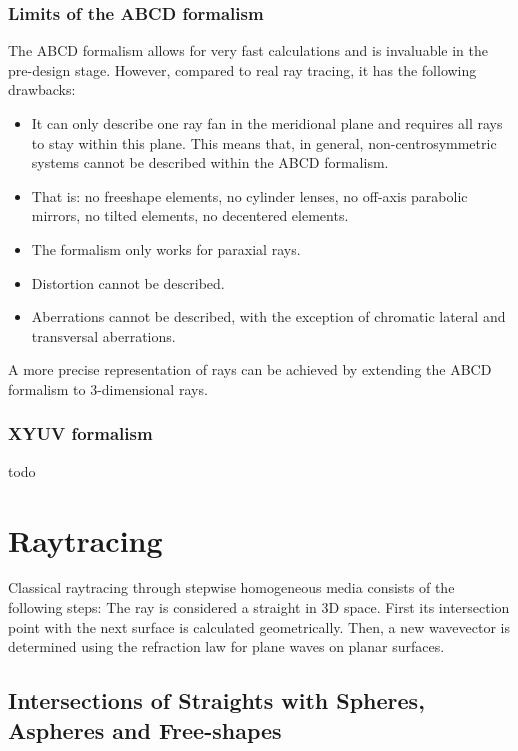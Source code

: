 \documentclass[12pt,a4paper,twoside,openright,BCOR10mm,headsepline,titlepage,abstracton,chapterprefix,final]{scrreprt}
\begin{document}
\subsection{Limits of the ABCD formalism}
The ABCD formalism allows for very fast calculations and is invaluable in the pre-design stage. 
However, compared to real ray tracing, it has the following drawbacks:
\begin{itemize}
 \item It can only describe one ray fan in the meridional plane and requires all rays to stay within this plane. This means that, in general, non-centrosymmetric systems cannot be described within the ABCD formalism.
 \item That is: no freeshape elements, no cylinder lenses, no off-axis parabolic mirrors, no tilted elements, no decentered elements.
 \item The formalism only works for paraxial rays.
 \item Distortion cannot be described.
 \item Aberrations cannot be described, with the exception of chromatic lateral and transversal aberrations.
\end{itemize}

A more precise representation of rays can be achieved by extending the ABCD formalism to 3-dimensional rays.

\subsection{XYUV formalism}

todo


\chapter{Raytracing}

Classical raytracing through stepwise homogeneous media consists of the following steps: 
The ray is considered a straight in 3D space. 
First its intersection point with the next surface is calculated geometrically. 
Then, a new wavevector is determined using the refraction law for plane waves on planar surfaces.


\section{Intersections of Straights with Spheres, Aspheres and Free-shapes}\label{subsec:intersectionformulas}
\end{document}
